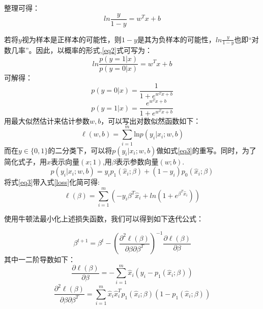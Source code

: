 \documentclass{SCIS2020cn}
\begin{document}
整理可得：
\begin{equation}
    \label{eq2}
    ln\frac{y}{1-y}=w^Tx+b
\end{equation}

若将$y$视为样本是正样本的可能性，则$1-y$是其为负样本的可能性，$ln\frac{y}{1-y}$也即“对数几率”。因此，以概率的形式,\ref{eq2}式可写为：
\begin{equation}
    ln\frac{p(y=1|x)}{p(y=0|x)}=w^Tx+b
\end{equation}
可解得：
\begin{equation}
    p(y=0|x)=\frac{1}{1+e^{w^Tx+b}}
\end{equation}
\begin{equation}
    p(y=1|x)=\frac{e^{w^Tx+b}}{1+e^{w^Tx+b}}
\end{equation}
用最大似然估计来估计参数$w,b$，可以写出对数似然函数如下：
\begin{equation}
    \label{loss}
    \ell (w,b)=\sum_{i=1}^m \text{ln} p(y_i|x_i;w,b)
\end{equation}
而在$y\in\{0,1\}$的二分类下，可以将$p(y_i|x_i;w,b)$做如式\ref{eq3}的重写。同时，为了简化式子，用$\hat x$表示向量$(x;1)$,用$\beta$表示参数向量$(w;b)$.
\begin{equation}
    \label{eq3}
    p(y_i|x_i;w,b)=y_i p_1(\hat x_i;\beta)+(1-y_i) p_0(\hat x_i;\beta)
\end{equation}
将式\ref{eq3}带入式\ref{loss}化简可得:
\begin{equation}
    \ell(\beta)=\sum_{i=1}^m(-y_i\beta^T\hat x_i+ln\left(1+e^{\beta^T\hat x_i}\right))
\end{equation}

使用牛顿法最小化上述损失函数，我们可以得到如下迭代公式：

\begin{equation}
    \beta^{t+1}=\beta^t-\left(\frac{\partial^2\ell(\beta)}{\partial\beta\partial\beta^T}\right)^{-1}\frac{\partial\ell(\beta)}{\partial\beta}
\end{equation}
其中一二阶导数如下：
\begin{equation}
    \frac{\partial\ell(\beta)}{\partial\beta}=-\sum_{i=1}^m\hat x_i(y_i-p_1(\hat x_i;\beta))
\end{equation}
\begin{equation}
    \frac{\partial^2\ell(\beta)}{\partial\beta\partial\beta^T}=\sum_{i=1}^m\hat x_i\hat x_i^Tp_1(\hat x_i;\beta)(1-p_1(\hat x_i;\beta))
\end{equation}
\end{document}
